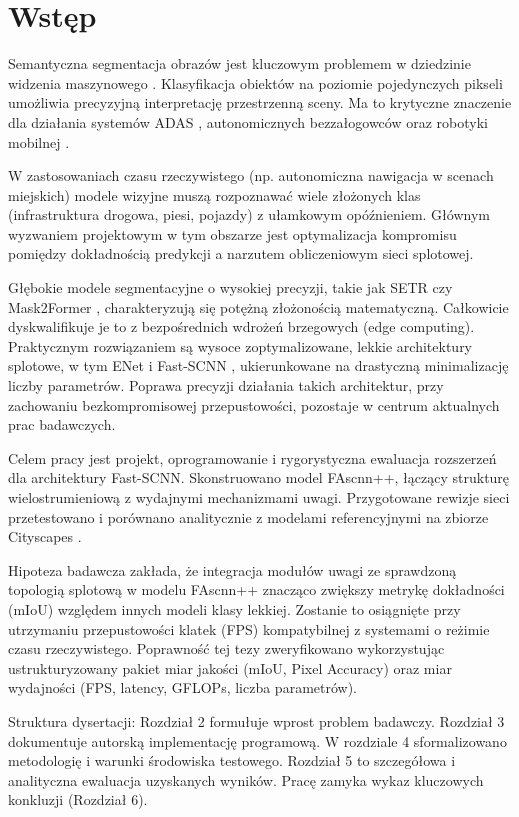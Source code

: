 \chapter{Wstęp}

Semantyczna segmentacja obrazów jest kluczowym problemem w dziedzinie widzenia maszynowego . Klasyfikacja obiektów na poziomie pojedynczych pikseli umożliwia precyzyjną interpretację przestrzenną sceny. Ma to krytyczne znaczenie dla działania systemów ADAS , autonomicznych bezzałogowców  oraz robotyki mobilnej .

W zastosowaniach czasu rzeczywistego (np. autonomiczna nawigacja w scenach miejskich) modele wizyjne muszą rozpoznawać wiele złożonych klas (infrastruktura drogowa, piesi, pojazdy) z ułamkowym opóźnieniem. Głównym wyzwaniem projektowym w tym obszarze jest optymalizacja kompromisu pomiędzy dokładnością predykcji a narzutem obliczeniowym sieci splotowej.

Głębokie modele segmentacyjne o wysokiej precyzji, takie jak SETR  czy Mask2Former , charakteryzują się potężną złożonością matematyczną. Całkowicie dyskwalifikuje je to z bezpośrednich wdrożeń brzegowych (edge computing). Praktycznym rozwiązaniem są wysoce zoptymalizowane, lekkie architektury splotowe, w tym ENet  i Fast-SCNN , ukierunkowane na drastyczną minimalizację liczby parametrów. Poprawa precyzji działania takich architektur, przy zachowaniu bezkompromisowej przepustowości, pozostaje w centrum aktualnych prac badawczych.

Celem pracy jest projekt, oprogramowanie i rygorystyczna ewaluacja rozszerzeń dla architektury Fast-SCNN. Skonstruowano model FAscnn++, łączący strukturę wielostrumieniową z wydajnymi mechanizmami uwagi. Przygotowane rewizje sieci przetestowano i porównano analitycznie z modelami referencyjnymi na zbiorze Cityscapes .

Hipoteza badawcza zakłada, że integracja modułów uwagi ze sprawdzoną topologią splotową w modelu FAscnn++ znacząco zwiększy metrykę dokładności (mIoU) względem innych modeli klasy lekkiej. Zostanie to osiągnięte przy utrzymaniu przepustowości klatek (FPS) kompatybilnej z systemami o reżimie czasu rzeczywistego. Poprawność tej tezy zweryfikowano wykorzystując ustrukturyzowany pakiet miar jakości (mIoU, Pixel Accuracy) oraz miar wydajności (FPS, latency, GFLOPs, liczba parametrów).

Struktura dysertacji: Rozdział 2 formułuje wprost problem badawczy. Rozdział 3 dokumentuje autorską implementację programową. W rozdziale 4 sformalizowano metodologię i warunki środowiska testowego. Rozdział 5 to szczegółowa i analityczna ewaluacja uzyskanych wyników. Pracę zamyka wykaz kluczowych konkluzji (Rozdział 6).
